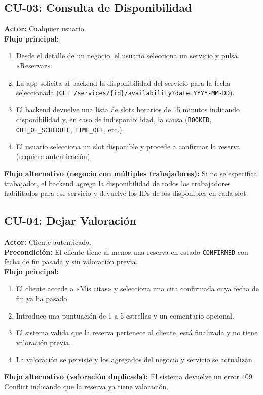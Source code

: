 \documentclass[12pt,a4paper,twoside]{report}
\begin{document}
\subsection{CU-03: Consulta de Disponibilidad}

\begin{tcolorbox}[definicionStyle, title={CU-03 — Consulta de Disponibilidad}]
\textbf{Actor:} Cualquier usuario. \\
\textbf{Flujo principal:}
\begin{enumerate}
  \item Desde el detalle de un negocio, el usuario selecciona un servicio y pulsa «Reservar».
  \item La app solicita al backend la disponibilidad del servicio para la fecha seleccionada (\texttt{GET /services/\{id\}/availability?date=YYYY-MM-DD}).
  \item El backend devuelve una lista de slots horarios de 15 minutos indicando disponibilidad y, en caso de indisponibilidad, la causa (\texttt{BOOKED}, \texttt{OUT\_OF\_SCHEDULE}, \texttt{TIME\_OFF}, etc.).
  \item El usuario selecciona un slot disponible y procede a confirmar la reserva (requiere autenticación).
\end{enumerate}
\textbf{Flujo alternativo (negocio con múltiples trabajadores):} Si no se especifica trabajador, el backend agrega la disponibilidad de todos los trabajadores habilitados para ese servicio y devuelve los IDs de los disponibles en cada slot.
\end{tcolorbox}

\subsection{CU-04: Dejar Valoración}

\begin{tcolorbox}[definicionStyle, title={CU-04 — Dejar Valoración}]
\textbf{Actor:} Cliente autenticado. \\
\textbf{Precondición:} El cliente tiene al menos una reserva en estado \texttt{CONFIRMED} con fecha de fin pasada y sin valoración previa. \\
\textbf{Flujo principal:}
\begin{enumerate}
  \item El cliente accede a «Mis citas» y selecciona una cita confirmada cuya fecha de fin ya ha pasado.
  \item Introduce una puntuación de 1 a 5 estrellas y un comentario opcional.
  \item El sistema valida que la reserva pertenece al cliente, está finalizada y no tiene valoración previa.
  \item La valoración se persiste y los agregados del negocio y servicio se actualizan.
\end{enumerate}
\textbf{Flujo alternativo (valoración duplicada):} El sistema devuelve un error 409 Conflict indicando que la reserva ya tiene valoración.
\end{tcolorbox}
\end{document}
